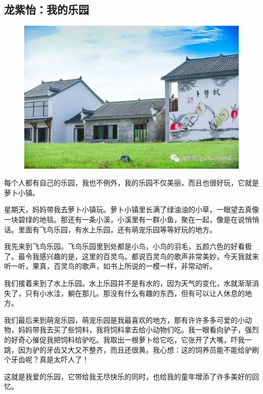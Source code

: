 \vspace{10pt}

{\centering\subsection*{龙紫怡：我的乐园}}


\renewcommand{\leftmark}{龙紫怡：我的乐园}

\begin{figure}[htbp]

\centering

\includegraphics[width = .5\textwidth]{./ch/18.jpg}

\end{figure}



每个人都有自己的乐园，我也不例外，我的乐园不仅美丽，而且也很好玩，它就是萝卜小镇。



星期天，妈妈带我去萝卜小镇玩。萝卜小镇里长满了绿油油的小草，一眼望去真像一块碧绿的地毯。那还有一条小溪，小溪里有一群小鱼，聚在一起，像是在说悄悄话。里面有飞鸟乐园，有水上乐园，还有萌宠乐园等等好玩的地方。

我先来到飞鸟乐园。飞鸟乐园里到处都是小鸟，小鸟的羽毛，五颜六色的好看极了。最令我感兴趣的是，这里的百灵鸟。都说百灵鸟的歌声非常美妙，今天我就来听一听，果真，百灵鸟的歌声，如书上所说的一模一样，非常动听。

我们接着来到了水上乐园。水上乐园并不是有水的，因为天气的变化，水就渐渐消失了，只有小水洼，躺在那儿。那没有什么有趣的东西，但有可以让人休息的地方。

我们最后来到萌宠乐园，萌宠乐园是我最喜欢的地方，那有许许多多可爱的小动物，妈妈带我去买了些饲料，我将饲料拿去给小动物们吃。我一眼看向驴子，强烈的好奇心催促我把饲料给驴吃。我取出一根萝卜给它吃，它张开了大嘴，吓我一跳，因为驴的牙齿又大又不整齐，而且还很黄。我心想：这的饲养员能不能给驴刷个牙齿呢？真是太吓人了！

这就是我爱的乐园，它带给我无尽快乐的同时，也给我的童年增添了许多美好的回忆。





